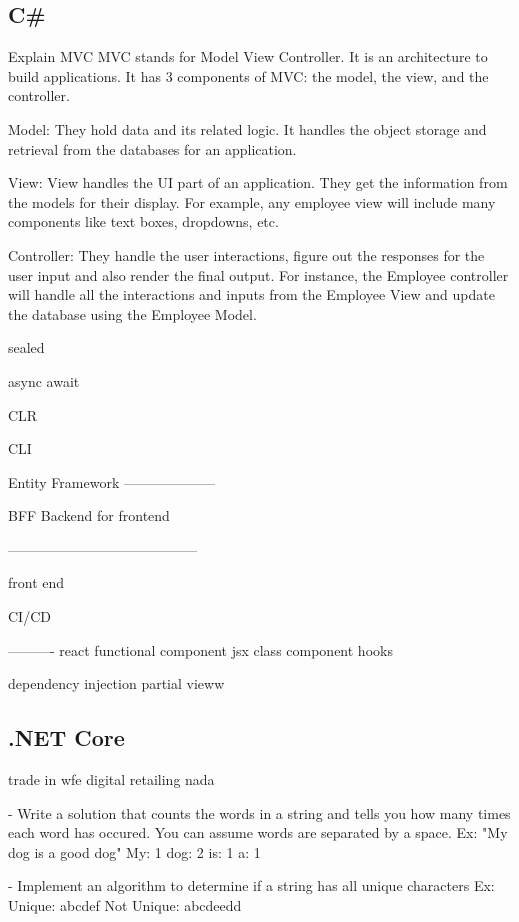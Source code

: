 \begin{multicols}{2}
\subsection{C\#}

Explain MVC
MVC stands for Model View Controller. It is an architecture to build applications. It has 3 components of MVC: the model, the view, and the controller.

Model: They hold data and its related logic. It handles the object storage and retrieval from the databases for an application. 

View: View handles the UI part of an application. They get the information from the models for their display. For example, any employee view will include many components like text boxes, dropdowns, etc.

Controller: They handle the user interactions, figure out the responses for the user input and also render the final output. For instance, the Employee controller will handle all the interactions and inputs from the Employee View and update the database using the Employee Model.

sealed

async await

CLR

CLI

Entity Framework
--------------------

BFF Backend for frontend

-----------------------------------------

front end

CI/CD

----------
react 
functional component
jsx
class component
hooks

dependency injection
partial vieww

\subsection{.NET Core}

trade in wfe
digital retailing
nada

- Write a solution that counts the words in a string and tells you how many times each word has occured. You can assume words are separated by a space.
    Ex:
        "My dog is a good dog"
            My: 1
            dog: 2
            is: 1
            a: 1

- Implement an algorithm to determine if a string has all unique characters
    Ex: 
        Unique: abcdef
        Not Unique: abcdeedd
        

\end{multicols}
